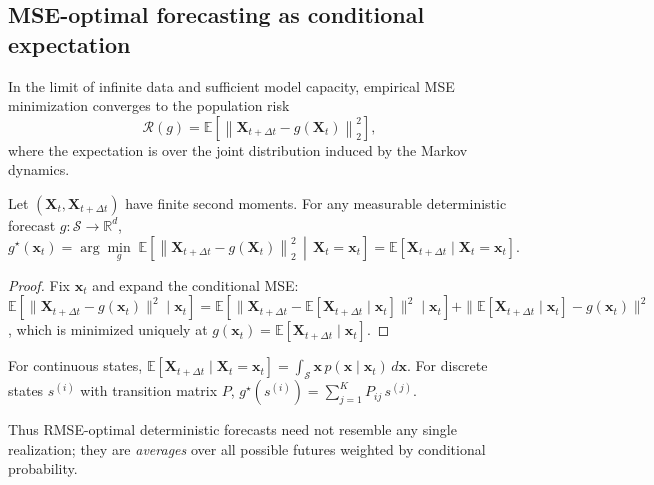 
\subsection{MSE-optimal forecasting as conditional expectation}
\label{subsec:mse_conditional_mean}

In the limit of infinite data and sufficient model capacity, empirical MSE minimization converges to the population risk
\begin{equation}
    \mathcal{R}(g)
    =
    \mathbb{E}\!\left[
        \left\|
            \mathbf{X}_{t+\Delta t}
            -
            g(\mathbf{X}_t)
        \right\|_2^2
    \right],
    \label{eq:population_mse}
\end{equation}
where the expectation is over the joint distribution induced by the Markov dynamics.

\begin{proposition}
\label{prop:mse_conditional_mean}
Let $(\mathbf{X}_t, \mathbf{X}_{t+\Delta t})$ have finite second moments.
For any measurable deterministic forecast $g:\mathcal{S}\to\mathbb{R}^d$,
\begin{equation}
    g^\star(\mathbf{x}_t)
    =
    \arg\min_{g}\;
    \mathbb{E}\!\left[
        \left\|
            \mathbf{X}_{t+\Delta t}-g(\mathbf{X}_t)
        \right\|_2^2
        \,\middle|\,
        \mathbf{X}_t=\mathbf{x}_t
    \right]
    =
    \mathbb{E}\!\left[\mathbf{X}_{t+\Delta t}\mid \mathbf{X}_t=\mathbf{x}_t\right].
\end{equation}
\end{proposition}

\begin{proof}
Fix $\mathbf{x}_t$ and expand the conditional MSE:
$\mathbb{E}[\|\mathbf{X}_{t+\Delta t}-g(\mathbf{x}_t)\|^2\mid \mathbf{x}_t]
=\mathbb{E}[\|\mathbf{X}_{t+\Delta t}-\mathbb{E}[\mathbf{X}_{t+\Delta t}\mid \mathbf{x}_t]\|^2\mid \mathbf{x}_t]
+\|\mathbb{E}[\mathbf{X}_{t+\Delta t}\mid \mathbf{x}_t]-g(\mathbf{x}_t)\|^2$,
which is minimized uniquely at $g(\mathbf{x}_t)=\mathbb{E}[\mathbf{X}_{t+\Delta t}\mid \mathbf{x}_t]$.
\end{proof}

\begin{corollary}
\label{cor:weighted_average}
For continuous states,
$\mathbb{E}[\mathbf{X}_{t+\Delta t}\mid \mathbf{X}_t=\mathbf{x}_t]
=\int_{\mathcal{S}} \mathbf{x}\, p(\mathbf{x}\mid \mathbf{x}_t)\,d\mathbf{x}$.
For discrete states $s^{(i)}$ with transition matrix $P$,
$g^\star(s^{(i)})=\sum_{j=1}^{K} P_{ij}\, s^{(j)}$.
\end{corollary}

Thus RMSE-optimal deterministic forecasts need not resemble any single realization;
they are \emph{averages} over all possible futures weighted by conditional probability.
